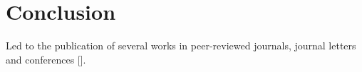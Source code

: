
\chapter{Conclusion}\label{ch:conclusion}


Led to the publication of several works in peer-reviewed journals, journal letters and conferences [].